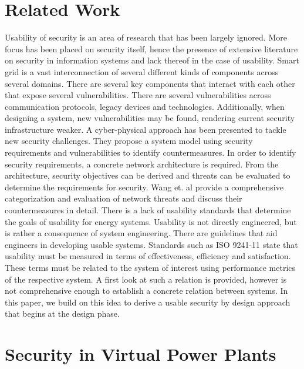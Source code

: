 \section{Related Work}
Usability of security is an area of research that has been largely ignored. More focus has been placed on security itself, hence the presence of extensive literature on security in information systems and lack thereof in the case of usability. Smart grid is a vast interconnection of several different kinds of components across several domains. There are several key components that interact with each other that expose several vulnerabilities\cite{liu2012cyber}. There are several vulnerabilities across communication protocols, legacy devices and technologies. Additionally, when designing a system, new vulnerabilities may be found, rendering current security infrastructure weaker. A cyber-physical approach\cite{mo2012cyber} has been presented to tackle new security challenges. They propose a system model using security requirements and vulnerabilities to identify countermeasures. In order to identify security requirements, a concrete network architecture is required. From the architecture, security objectives can be derived and threats can be evaluated to determine the requirements for security. Wang et. al\cite{wang2013cyber} provide a comprehensive categorization and evaluation of network threats and discuss their countermeasures in detail.
\newline 
There is a lack of usability standards that determine the goals of usability for energy systems. Usability is not directly engineered, but is rather a consequence of system engineering. There are guidelines that aid engineers in developing usable systems\cite{nurse2011guidelines}. Standards such as ISO 9241-11\cite{bevan2015iso} state that usability must be measured in terms of effectiveness, efficiency and satisfaction. These terms must be related to the system of interest using performance metrics of the respective system. A first look at such a relation is provided\cite{kainda2010security}, however is not comprehensive enough to establish a concrete relation between systems. In this paper, we build on this idea to derive a usable security by design approach that begins at the design phase\cite{nielsen1992usability}. 

\section{Security in Virtual Power Plants}

